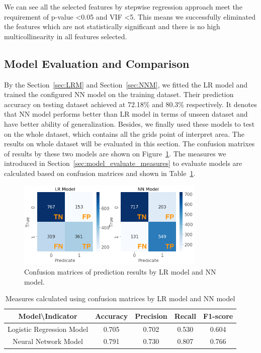 \documentclass[final-report]{report-template}
\begin{document}
We can see all the selected features by stepwise regression approach meet the requirement of p-value \textless 0.05 and VIF \textless 5.
This means we successfully eliminated the features which are not statistically significant and there is no high multicollinearity in all features selected.  

\subsection{Model Evaluation and Comparison}
\label{sec:model_evaluate_comparison}
By the Section~\ref{sec:LRM} and Section~\ref{sec:NNM}, we fitted the LR model and trained the configured NN model on the training dataset. 
Their prediction accuracy on testing dataset achieved at 72.18\% and 80.3\% respectively. 
It denotes that NN model performs better than LR model in terms of unseen dataset and have better ability of generalization.
Besides, we finally used these models to test on the whole dataset, which contains all the grids point of interpret area. The results on whole dataset will be evaluated in this section.
The confusion matrixes of results by these two models are shown on Figure~\ref{fig:confusion_matrix}. The measures we introduced in Section~\ref{sec:model_evaluate_measures} to evaluate models are calculated based on confusion matrices and shown in Table~\ref{tab:Indicators_by_confusion_matrix}.
\begin{figure}
    \begin{center}
        \includegraphics[width=0.8\textwidth]{confusion_matrix.png}
    \end{center}
    \caption{\label{fig:confusion_matrix} Confusion matrices of prediction results by LR model and NN model.}
\end{figure}

\begin{table}
    \centering
    \caption{Measures calculated using confusion matrices by LR model and NN model}
    \label{tab:Indicators_by_confusion_matrix}
    \begin{tabular}{|c|c|c|c|c|}
    \hline
    Model\textbackslash{}Indicator & Accuracy   & Precision & Recall & F1-score \\ \hline
    Logistic Regression Model      & 0.705 & 0.702     & 0.530  & 0.604    \\ \hline
    Neural Network Model           & 0.791  & 0.730     & 0.807  & 0.766    \\ \hline
    \end{tabular}
    \end{table}
    
\end{document}
